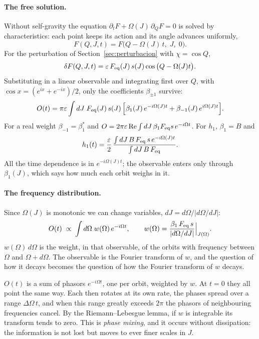 \documentclass[11pt,a4paper]{article}
\begin{document}
\paragraph{The free solution.}
\label{sec:libre}
Without self-gravity the equation $\partial_tF+\Omega(J)\,\partial_QF=0$ is solved by
characteristics: each point keeps its action and its angle advances uniformly,
\[
  F(Q,J,t) = F\big(Q-\Omega(J)\,t,\;J,\;0\big).
\]
For the perturbation of Section~\ref{sec:perturbacion} with $\chi=\cos Q$,
\[
  \delta F(Q,J,t)=\varepsilon\,F_{\rm eq}(J)\,s(J)\cos\big(Q-\Omega(J)t\big).
\]
Substituting in a linear observable and integrating first over $Q$, with
$\cos x=(e^{ix}+e^{-ix})/2$, only the coefficients $\beta_{\pm1}$ survive:
\[
  O(t) = \pi\varepsilon\int dJ\;F_{\rm eq}(J)\,s(J)\,
  \Big[\beta_1(J)\,e^{-i\Omega(J)t}+\beta_{-1}(J)\,e^{i\Omega(J)t}\Big].
\]
For a real weight $\beta_{-1}=\beta_1^*$ and $O=2\pi\varepsilon\,\mathrm{Re}\int
dJ\,\beta_1F_{\rm eq}s\,e^{-i\Omega t}$. For $h_1$, $\beta_1=B$ and
\[
  h_1(t) = \frac{\varepsilon}{2}\,\frac{\int dJ\,B\,F_{\rm eq}\,s\,e^{-i\Omega(J)t}}{\int dJ\,B\,F_{\rm eq}} .
\]
All the time dependence is in $e^{-i\Omega(J)t}$; the observable enters only through
$\beta_1(J)$, which says how much each orbit weighs in it.

\paragraph{The frequency distribution.} Since $\Omega(J)$ is monotonic we can change
variables, $dJ=d\Omega/|d\Omega/dJ|$:
\[
  O(t)\;\propto\;\int d\Omega\;w(\Omega)\,e^{-i\Omega t},\qquad
  w(\Omega)=\frac{\beta_1\,F_{\rm eq}\,s}{|d\Omega/dJ|}\Big|_{J(\Omega)} .
\]
$w(\Omega)\,d\Omega$ is the weight, in that observable, of the orbits with frequency between
$\Omega$ and $\Omega+d\Omega$. The observable is the Fourier transform of $w$, and the question of
how it decays becomes the question of how the Fourier transform of $w$ decays.

$O(t)$ is a sum of phasors $e^{-i\Omega t}$, one per orbit, weighted by $w$. At $t=0$ they all
point the same way. Each then rotates at its own rate, the phases spread over a range
$\Delta\Omega\,t$, and when this range greatly exceeds $2\pi$ the phasors of neighbouring
frequencies cancel. By the Riemann--Lebesgue lemma, if $w$ is integrable its transform
tends to zero. This is \emph{phase mixing}, and it occurs without dissipation: the
information is not lost but moves to ever finer scales in $J$.
\end{document}
